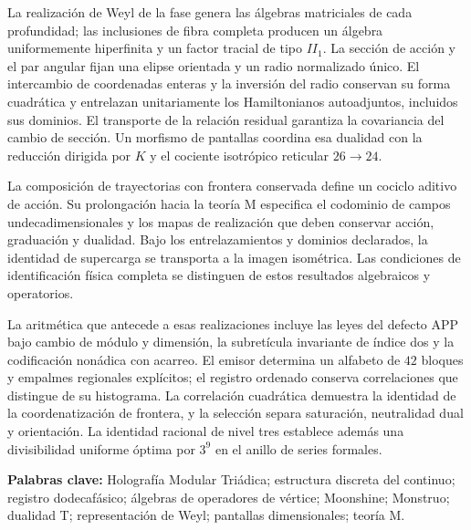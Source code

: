 La realización de Weyl de la fase genera las álgebras matriciales de cada
profundidad; las inclusiones de fibra completa producen un álgebra
uniformemente hiperfinita y un factor tracial de tipo \(II_1\).
La sección de acción y el par angular fijan una elipse orientada y un
radio normalizado único. El intercambio de coordenadas enteras y la
inversión del radio conservan su forma cuadrática y entrelazan
unitariamente los Hamiltonianos autoadjuntos, incluidos sus dominios.
El transporte de la relación residual garantiza la covariancia del cambio
de sección. Un morfismo de pantallas coordina esa dualidad con la reducción
dirigida por \(K\) y el cociente isotrópico reticular \(26\to24\).

La composición de trayectorias con frontera conservada define un cociclo
aditivo de acción. Su prolongación hacia la teoría M especifica el
codominio de campos undecadimensionales y los mapas de realización que
deben conservar acción, graduación y dualidad. Bajo los entrelazamientos
y dominios declarados, la identidad de supercarga se transporta a la imagen
isométrica. Las condiciones de identificación física completa se
distinguen de estos resultados algebraicos y operatorios.
\par\medskip

La aritmética que antecede a esas realizaciones incluye las leyes del
defecto APP bajo cambio de módulo y dimensión, la subretícula invariante
de índice dos y la codificación nonádica con acarreo. El emisor determina
un alfabeto de \(42\) bloques y empalmes regionales explícitos; el registro
ordenado conserva correlaciones que distingue de su histograma. La
correlación cuadrática demuestra la identidad de la coordenatización de frontera,
y la selección separa saturación, neutralidad dual y orientación. La
identidad racional de nivel tres establece además una divisibilidad
uniforme óptima por \(3^9\) en el anillo de series formales.

\noindent\textbf{Palabras clave:} Holografía Modular Triádica; estructura
discreta del continuo; registro dodecafásico; álgebras de operadores de
vértice; Moonshine; Monstruo; dualidad T; representación de Weyl;
pantallas dimensionales; teoría M.
\par\endgroup
